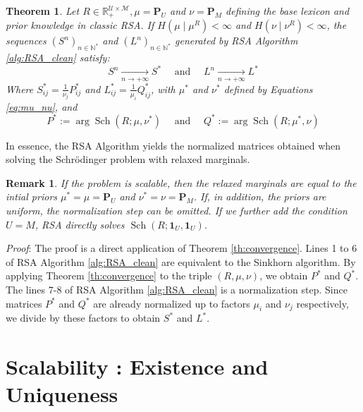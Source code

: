 \documentclass{article}
\newtheorem{theorem}{Theorem}[section] %
\newtheorem{remark}{Remark}[section] %
\begin{document}
\begin{theorem}\label{th:RSA_solves_SB}
    Let $R \in \mathbb{R}_{+}^{\mathcal{U} \times \mathcal{M}}, \mu = \mathbf{P}_U$ and $\nu = \mathbf{P}_M$ defining the base lexicon and prior knowledge in classic RSA. If $H(\mu \mid \mu^R)<\infty $ and $H(\nu \mid \nu^R) < \infty$, the sequences $\left(S^n\right)_{n \in \mathbb{N}^*}$ and $\left(L^n\right)_{n \in \mathbb{N}^*}$ generated by RSA Algorithm \ref{alg:RSA_clean} satisfy:
    $$
    S^n \underset{n \rightarrow+\infty}{\longrightarrow} S^* \quad \text { and } \quad L^n \underset{n \rightarrow+\infty}{\longrightarrow} L^*
    $$
    Where $S_{ij}^* = \frac{1}{\nu_j}P_{ij}^*$ and $L_{ij}^* = \frac{1}{\mu_i}Q_{ij}^*$, with $\mu^*$ and $\nu^*$ defined by Equations \ref{eq:mu_nu}, and
    \begin{equation}\label{eq:SK_PQ}
        P^*:=\arg \operatorname{Sch}(R ; \mu, \nu^*) \quad \text { and } \quad Q^*:=\arg \operatorname{Sch}(R ; \mu^*, \nu)
    \end{equation}
\end{theorem}

In essence, the RSA Algorithm yields the normalized matrices obtained when solving the Schrödinger problem with relaxed marginals.

\begin{remark}
    If the problem is scalable, then the relaxed marginals are equal to the intial priors $\mu^* = \mu = \mathbf{P}_U$ and $\nu^* = \nu = \mathbf{P}_M$. If, in addition, the priors are uniform, the normalization step can be omitted. If we further add the condition $U=M$, RSA directly solves $\operatorname{Sch}(R ; \mathbf{1}_U, \mathbf{1}_U)$.
\end{remark}

\textit{Proof}: The proof is a direct application of Theorem \ref{th:convergence}. Lines 1 to 6 of RSA Algorithm \ref{alg:RSA_clean} are equivalent to the Sinkhorn algorithm. By applying Theorem \ref{th:convergence} to the triple $(R,\mu,\nu)$, we obtain $P^*$ and $Q^*$. The lines 7-8 of RSA Algorithm \ref{alg:RSA_clean} is a normalization step. Since matrices $P^*$ and $Q^*$ are already normalized up to factors $\mu_i$ and $\nu_j$ respectively, we divide by these factors to obtain $S^*$ and $L^*$.


\section{Scalability : Existence and Uniqueness}
\end{document}
